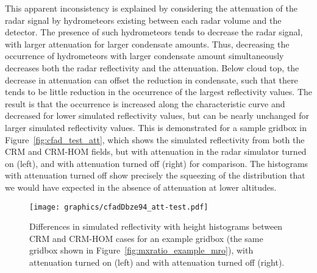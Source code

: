 This apparent inconsistency is explained by considering the attenuation
of the radar signal by hydrometeors existing between each radar volume
and the detector. The presence of such hydrometeors tends to decrease
the radar signal, with larger attenuation for larger condensate amounts.
Thus, decreasing the occurrence of hydrometeors with larger condensate
amount simultaneously decreases both the radar reflectivity and the
attenuation. Below cloud top, the decrease in attenuation can offset the
reduction in condensate, such that there tends to be little reduction in
the occurrence of the largest reflectivity values. The result is that
the occurrence is increased along the characteristic curve and decreased
for lower simulated reflectivity values, but can be nearly unchanged for
larger simulated reflectivity values. This is demonstrated for a sample
gridbox in Figure~\ref{fig:cfad_test_att}, which shows the simulated
reflectivity from both the CRM and CRM-HOM fields, but with attenuation
in the radar simulator turned on (left), and with attenuation turned off
(right) for comparison. The histograms with attenuation turned off show
precisely the squeezing of the distribution that we would have expected
in the absence of attenuation at lower altitudes.

\begin{figure}[tp]
\centering
\texttt{[image: graphics/cfadDbze94\_att-test.pdf]}
\caption{\label{fig:cfad_test_att}Differences in simulated reflectivity
with height histograms between CRM and CRM-HOM cases for an example
gridbox (the same gridbox shown in
Figure~\ref{fig:mxratio_example_mro}), with attenuation turned on (left)
and with attenuation turned off (right).}\label{fig:cfadux5ftestux5fatt}
\end{figure}

